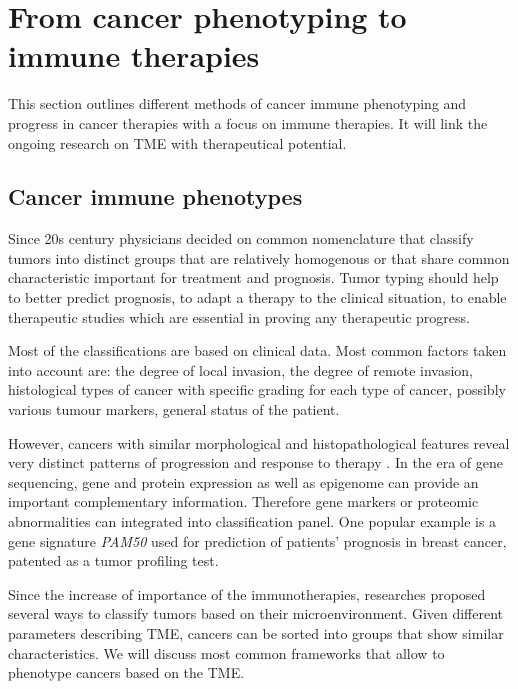 \documentclass[12pt,]{book}
\theoremstyle{definition}
\theoremstyle{definition}
\theoremstyle{definition}
\theoremstyle{remark}
\begin{document}
\hypertarget{immunotherapies}{%
\section{From cancer phenotyping to immune
therapies}\label{immunotherapies}}

This section outlines different methods of cancer immune phenotyping and
progress in cancer therapies with a focus on immune therapies. It will
link the ongoing research on TME with therapeutical potential.

\hypertarget{cancer-immune-phenotypes}{%
\subsection{Cancer immune phenotypes}\label{cancer-immune-phenotypes}}

Since 20s century physicians decided on common nomenclature that
classify tumors into distinct groups that are relatively homogenous or
that share common characteristic important for treatment and prognosis.
Tumor typing should help to better predict prognosis, to adapt a therapy
to the clinical situation, to enable therapeutic studies which are
essential in proving any therapeutic progress.

Most of the classifications are based on clinical data. Most common
factors taken into account are: the degree of local invasion, the degree
of remote invasion, histological types of cancer with specific grading
for each type of cancer, possibly various tumour markers, general status
of the patient.

However, cancers with similar morphological and histopathological
features reveal very distinct patterns of progression and response to
therapy \citep{Galon2014}. In the era of gene sequencing, gene and
protein expression as well as epigenome can provide an important
complementary information. Therefore gene markers or proteomic
abnormalities can integrated into classification panel. One popular
example is a gene signature \emph{PAM50} \citep{Parker2009} used for
prediction of patients' prognosis in breast cancer, patented as a tumor
profiling test.

Since the increase of importance of the immunotherapies, researches
proposed several ways to classify tumors based on their
microenvironment. Given different parameters describing TME, cancers can
be sorted into groups that show similar characteristics. We will discuss
most common frameworks that allow to phenotype cancers based on the TME.
\end{document}
